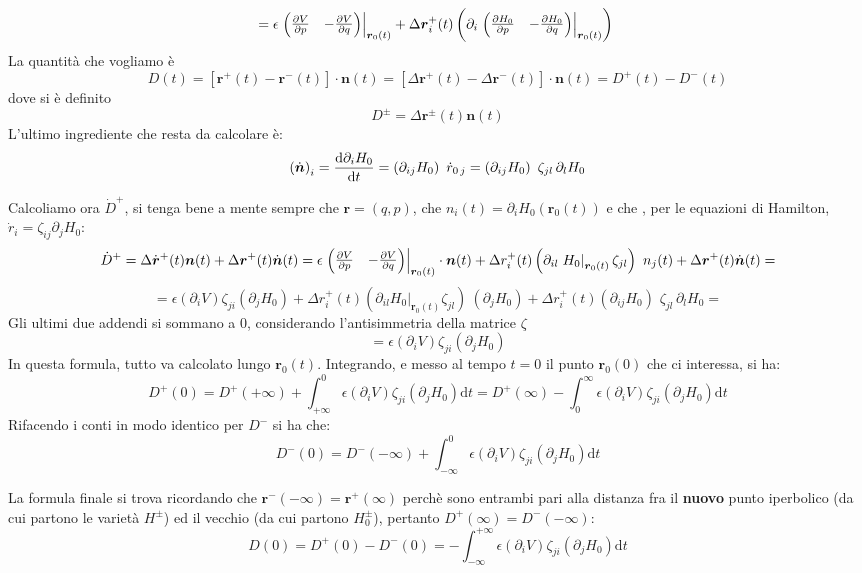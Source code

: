 \documentclass[a4paper,12pt]{article}
\theoremstyle{plain}
\renewcommand{\vec}[1]{{\boldsymbol{#1}}}
\theoremstyle{definition}
\renewcommand{\d}{\text{d}}
\theoremstyle{remark}
\begin{document}
\[=\epsilon\left.\begin{pmatrix}
\pdv{V}{p}&
-\pdv{V}{q}
\end{pmatrix}	\right|_{\vec{r}_0(t)}+\Delta \vec{r}^+_i(t)\left(\partial_i\left.\begin{pmatrix}
\pdv{H_0}{p}&
-\pdv{H_0}{q}
\end{pmatrix}	\right|_{\vec{r}_0(t)}			\right)\	\]
La quantità che vogliamo è \[D(t)=[\vec{r}^+(t)-\vec{r}^-(t)]\cdot \vec{n}(t)=[\Delta\vec{r}^+(t)-\Delta\vec{r}^-(t)]\cdot \vec{n}(t)=D^+(t)-D^-(t)\] dove si è definito \[D^{\pm}=\Delta\vec{r}^\pm(t) \vec{n}(t)\]
L'ultimo ingrediente che resta da calcolare è:
\[\left(\dot{\vec{n}}\right)_i=\dv{\partial_iH_0}{t}=\left(\partial_{ij}H_0\right)\,\, \dot{r}_{0\,j}=	\left(\partial_{ij}H_0 \right)\,\,\zeta_{jl}\,\partial_lH_0	\]

Calcoliamo ora $\dot{D}^+$, si tenga bene a mente sempre che $\vec{r}=(q,p)$, che $n_i(t)=\partial_i H_0(\vec{r}_0(t))$ e che , per le equazioni di Hamilton, $\dot{r}_i=\zeta_{ij}\partial_j H_0$: 
\[\dot{D}^+=\Delta\dot{\vec{r}}^+(t) \vec{n}(t)	+\Delta\vec{r}^+(t) \dot{\vec{n}}(t)	=		\epsilon\left.\begin{pmatrix}
\pdv{V}{p}&
-\pdv{V}{q}
\end{pmatrix}	\right|_{\vec{r}_0(t)}\cdot \vec{n}(t)+\Delta {r}^+_i(t)\left(\partial_{il}\left.{H_0}	\right|_{\vec{r}_0(t)}	\zeta_{jl}		\right)\		{n}_j(t)	+\Delta\vec{r}^+(t) \dot{\vec{n}}(t)	=	\]
\[=	\epsilon\left(\partial_i{V} \right)	\zeta_{ji} \left(\partial_jH_0\right)+\Delta {r}^+_i(t)\left(\partial_{il}\left.{H_0}	\right|_{\vec{r}_0(t)}	\zeta_{jl}		\right)\ \left(\partial_jH_0\right)	+\Delta{r}_i^+(t)	\left(\partial_{ij}H_0 \right)\,\,\zeta_{jl}\,\partial_lH_0=	\]
Gli ultimi due addendi si sommano a $0$, considerando l'antisimmetria della matrice $\zeta$
\[=\epsilon\left(\partial_i{V} \right)	\zeta_{ji} \left(\partial_jH_0\right)\]
 In questa formula, tutto va calcolato lungo $\vec{r}_0(t)$.
 Integrando, e messo al tempo $t=0$ il punto $\vec{r}_0(0)$ che ci interessa, si ha:
 \[D^+(0)=D^+(+\infty)+\int_{+\infty}^0 \epsilon\left(\partial_i{V} \right)	\zeta_{ji} \left(\partial_jH_0\right)\d t=D^+(\infty)-\int_0^{\infty} \epsilon\left(\partial_i{V} \right)	\zeta_{ji} \left(\partial_jH_0\right)\d t\]
 Rifacendo i conti in modo identico per $D^-$ si ha che:
 \[D^-(0)=D^-(-\infty)+\int_{-\infty}^0 \epsilon\left(\partial_i{V} \right)	\zeta_{ji} \left(\partial_jH_0\right)\d t\]
 
 La formula finale si trova ricordando che $\vec{r}^-({-\infty})=\vec{r}^+(\infty)$ perchè sono entrambi pari alla distanza fra il \textbf{nuovo} punto iperbolico (da cui partono le varietà $H^\pm$) ed il vecchio (da cui partono $H_0^\pm$), pertanto $D^+(\infty)=D^-(-\infty)$:
 \[D(0)=D^+(0)-D^-(0)=-\int_{-\infty}^{+\infty}\epsilon\left(\partial_i{V} \right)	\zeta_{ji} \left(\partial_jH_0\right)\d t\]
 
\end{document}
